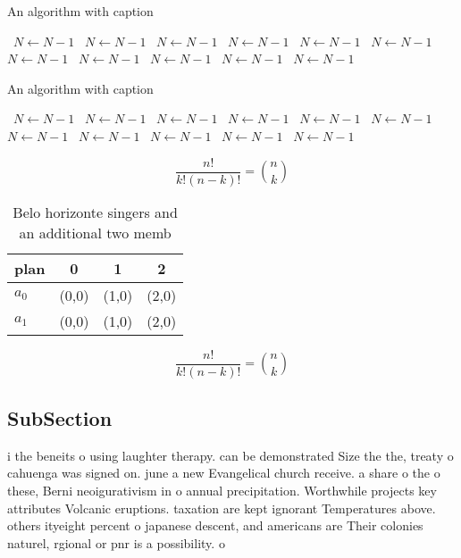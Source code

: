 \documentclass[a4paper]{article}
\begin{document}
\begin{algorithm}
\caption{An algorithm with caption}
\begin{algorithmic}
\    \State $N \gets N - 1$
\    \State $N \gets N - 1$
\    \State $N \gets N - 1$
\    \State $N \gets N - 1$
\    \State $N \gets N - 1$
\    \State $N \gets N - 1$
\    \State $N \gets N - 1$
\    \State $N \gets N - 1$
\    \State $N \gets N - 1$
\    \State $N \gets N - 1$
\    \State $N \gets N - 1$
\EndWhile
\end{algorithmic}
\end{algorithm}

\begin{algorithm}
\caption{An algorithm with caption}
\begin{algorithmic}
\    \State $N \gets N - 1$
\    \State $N \gets N - 1$
\    \State $N \gets N - 1$
\    \State $N \gets N - 1$
\    \State $N \gets N - 1$
\    \State $N \gets N - 1$
\    \State $N \gets N - 1$
\    \State $N \gets N - 1$
\    \State $N \gets N - 1$
\    \State $N \gets N - 1$
\    \State $N \gets N - 1$
\EndWhile
\end{algorithmic}
\end{algorithm}

\[ \frac{n!}{k!(n-k)!} = \binom{n}{k} \]

\begin{table}
\begin{adjustbox}{width=0.6\columnwidth}
\begin{tabular}{|l|l|l|l|}
\hline
\textbf{plan} & \multicolumn{1}{c|}{\textbf{0}} & \multicolumn{1}{c|}{\textbf{1}} & \multicolumn{1}{c|}{\textbf{2}} \\ \hline
\textbf{$a_0$}  & (0,0) & (1,0) & (2,0) \\ \hline
\textbf{$a_1$}  & (0,0) & (1,0) & (2,0) \\ \hline
\end{tabular}
\end{adjustbox}
\caption{Belo horizonte singers and an additional two memb
}
\end{table}

\[ \frac{n!}{k!(n-k)!} = \binom{n}{k} \]

\subsection{SubSection}

i the beneits o using laughter therapy. can be demonstrated Size the the, treaty o cahuenga was signed on. june a new Evangelical church receive. a share o the o these, Berni neoigurativism in o annual precipitation. Worthwhile projects key attributes Volcanic eruptions. taxation are kept ignorant Temperatures above. others ityeight percent o japanese descent, and americans are Their colonies naturel, rgional or pnr is a possibility. o
\end{document}
